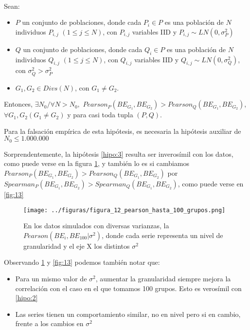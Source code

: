 \begin{hipotesis}\label{hipo:3}
    \\

    Sean:

    \begin{itemize}
    \item $P$ un conjunto de poblaciones, donde cada $P_i \in P$ es una población de $N$ individuos $P_{i,j}$ $(1 \leq j \leq N)$, con $P_{i,j}$ variables IID y $P_{i,j} \sim LN(0,\sigma_P^2)$ 
    \item $Q$ un conjunto de poblaciones, donde cada $Q_i \in P$ es una población de $N$ individuos $Q_{i,j}$ $(1 \leq j \leq N)$, con $Q_{i,j}$ variables IID y $Q_{i,j} \sim LN(0,\sigma_Q^2)$, con $\sigma_Q^2 > \sigma_P^2$
    \item $G_1, G_2 \in Divs(N)$, con $G_1 \neq G_2$.
    \end{itemize}

    
    Entonces, $\exists N_0/ \forall N > N_0, $ $Pearson_P(BE_{G_1},BE_{G_2}) > Pearson_Q(BE_{G_1}, BE_{G_2})$, $\forall G_1, G_2 (G_1 \neq G_2)$ y para casi toda tupla $(P,Q)$.
    

    Para la falsación empírica de esta hipótesis, es necesaria la hipótesis auxiliar de $N_0 \leq 1.000.000$
\end{hipotesis}

Sorprendentemente, la hipótesis \ref{hipo:3} resulta ser inverosímil con los datos, como puede verse en la figura \ref{fig:12}, y también lo es si cambiamos $Pearson_P(BE_{G_1},BE_{G_2}) > Pearson_Q(BE_{G_1}, BE_{G_2})$ por $Spearman_P(BE_{G_1},BE_{G_2}) > Spearman_Q(BE_{G_1}, BE_{G_2})$, como puede verse en \ref{fig:13}

\begin{figure}[H]
    \centering 
    \texttt{[image: ../figuras/figura\_12\_pearson\_hasta\_100\_grupos.png]} 
    \caption{En los datos simulados con diversas varianzas, la $Pearson(BE_i,BE_{100} | \sigma^2)$, donde cada serie representa un nivel de granularidad y el eje X los distintos $\sigma^2$}
    \label{fig:12}
\end{figure}

Observando \ref{fig:12}  y \ref{fig:13} podemos también notar que:

\begin{itemize}
    \item Para un mismo valor de $\sigma^2$, aumentar la granularidad siempre mejora la correlación con el caso en el que tomamos 100 grupos. Esto es verosímil con \ref{hipo:2}
    \item Las series tienen un comportamiento similar, no en nivel pero si en cambio, frente a los cambios en $\sigma^2$
\end{itemize}

